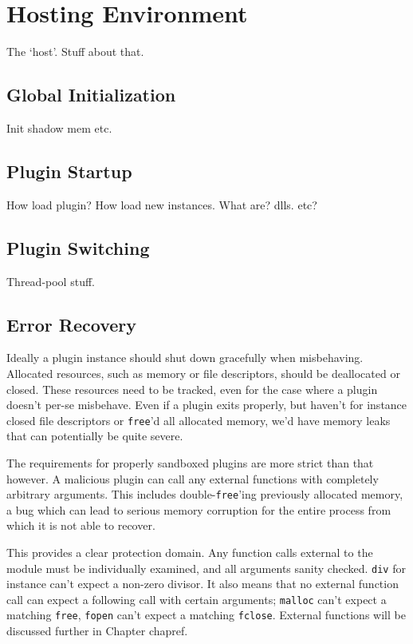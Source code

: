 \chapter {Hosting Environment}

The `host'. Stuff about that.

\section {Global Initialization}

Init shadow mem etc.

\section {Plugin Startup}

How load plugin? How load new instances. What are? dlls. etc?

\section {Plugin Switching}

Thread-pool stuff.

\section {Error Recovery}

Ideally a plugin instance should shut down gracefully when misbehaving.
Allocated resources, such as memory or file descriptors, should be deallocated
or closed. These resources need to be tracked, even for the case where a plugin
doesn't per-se misbehave. Even if a plugin exits properly, but haven't for
instance closed file descriptors or \texttt{free}'d all allocated memory, we'd
have memory leaks that can potentially be quite severe.

The requirements for properly sandboxed plugins are more strict than that
however. A malicious plugin can call any external functions with completely
arbitrary arguments. This includes double-\texttt{free}'ing previously
allocated memory, a bug which can lead to serious memory corruption for the
entire process from which it is not able to recover.

This provides a clear protection domain. Any function calls external to the
module must be individually examined, and all arguments sanity checked.
\texttt{div} for instance can't expect a non-zero divisor. It also means that
no external function call can expect a following call with certain arguments;
\texttt{malloc} can't expect a matching \texttt{free}, \texttt{fopen} can't
expect a matching \texttt{fclose}. External functions will be discussed further
in Chapter {chapref}. 

